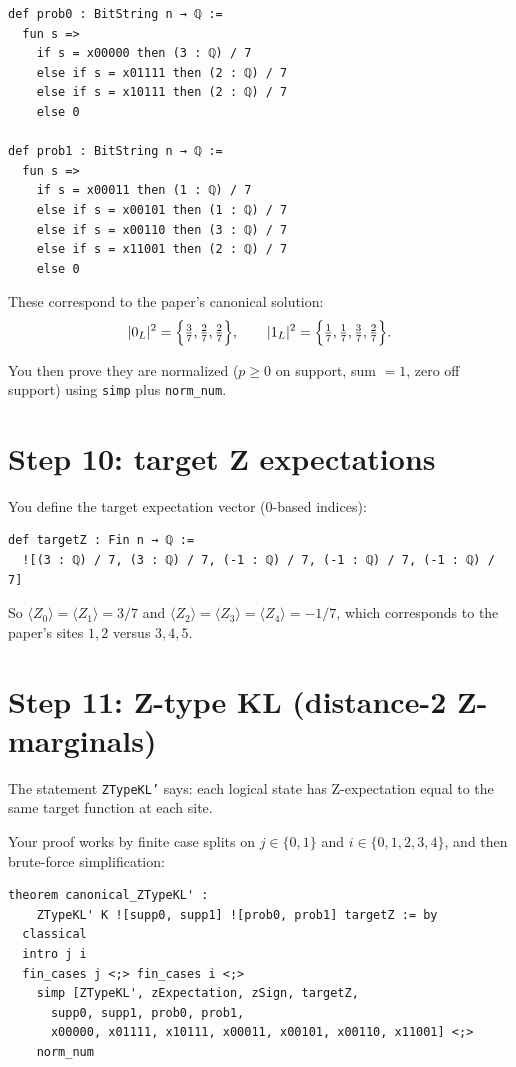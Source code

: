 \documentclass[11pt]{article}
\begin{document}
\begin{lstlisting}
def prob0 : BitString n → ℚ :=
  fun s =>
    if s = x00000 then (3 : ℚ) / 7
    else if s = x01111 then (2 : ℚ) / 7
    else if s = x10111 then (2 : ℚ) / 7
    else 0

def prob1 : BitString n → ℚ :=
  fun s =>
    if s = x00011 then (1 : ℚ) / 7
    else if s = x00101 then (1 : ℚ) / 7
    else if s = x00110 then (3 : ℚ) / 7
    else if s = x11001 then (2 : ℚ) / 7
    else 0
\end{lstlisting}

These correspond to the paper's canonical solution:
\[
|0_L|^2 = \Bigl\{\tfrac{3}{7},\tfrac{2}{7},\tfrac{2}{7}\Bigr\},\qquad
|1_L|^2 = \Bigl\{\tfrac{1}{7},\tfrac{1}{7},\tfrac{3}{7},\tfrac{2}{7}\Bigr\}.
\]

You then prove they are normalized (\(p\ge 0\) on support, sum \(=1\), zero off support) using \texttt{simp} plus \texttt{norm\_num}.

\section*{Step 10: target Z expectations}

You define the target expectation vector (0-based indices):

\begin{lstlisting}
def targetZ : Fin n → ℚ :=
  ![(3 : ℚ) / 7, (3 : ℚ) / 7, (-1 : ℚ) / 7, (-1 : ℚ) / 7, (-1 : ℚ) / 7]
\end{lstlisting}

So \(\langle Z_0\rangle=\langle Z_1\rangle=3/7\) and \(\langle Z_2\rangle=\langle Z_3\rangle=\langle Z_4\rangle=-1/7\),
which corresponds to the paper's sites \(1,2\) versus \(3,4,5\).

\section*{Step 11: Z-type KL (distance-2 Z-marginals)}

The statement \texttt{ZTypeKL'} says: each logical state has Z-expectation equal to the same target function at each site.

Your proof works by finite case splits on \(j\in\{0,1\}\) and \(i\in\{0,1,2,3,4\}\), and then brute-force simplification:

\begin{lstlisting}
theorem canonical_ZTypeKL' :
    ZTypeKL' K ![supp0, supp1] ![prob0, prob1] targetZ := by
  classical
  intro j i
  fin_cases j <;> fin_cases i <;>
    simp [ZTypeKL', zExpectation, zSign, targetZ,
      supp0, supp1, prob0, prob1,
      x00000, x01111, x10111, x00011, x00101, x00110, x11001] <;>
    norm_num
\end{lstlisting}
\end{document}
